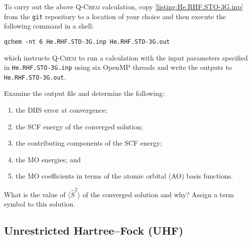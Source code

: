 		To carry out the above \textsc{Q-Chem} calculation, copy \cref{listing:He.RHF.STO-3G.inp} from the \texttt{git} repository to a location of your choice and then execute the following command in a shell:
			\begin{lstlisting}[style = custombash]
				qchem -nt 6 He.RHF.STO-3G.inp He.RHF.STO-3G.out
			\end{lstlisting}
		which instructs \textsc{Q-Chem} to run a calculation with the input parameters specified in \texttt{He.RHF.STO-3G.inp} using six OpenMP threads and write the outputs to \texttt{He.RHF.STO-3G.out}.
			\begin{Task}
				Examine the output file and determine the following:
				\begin{enumerate}[topsep=0pt,itemsep=-1ex,partopsep=1ex,parsep=1ex,label=(\alph*)]
					\item the DIIS error at convergence;
					\item the SCF energy of the converged solution;
					\item the contributing components of the SCF energy;
					\item the MO energies; and
					\item the MO coefficients in terms of the atomic orbital (AO) basis functions.
				\end{enumerate}
				What is the value of $\langle \hat{S}^2 \rangle$ of the converged solution and why? Assign a term symbol to this solution.
			\end{Task}

		
	\subsection{Unrestricted Hartree--Fock (UHF)}
		
